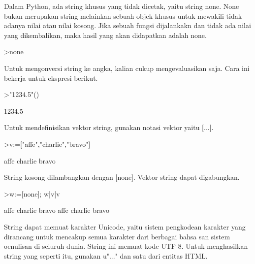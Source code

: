 \documentclass{article}
\begin{document}
\begin{eulernotebook}
\begin{eulercomment}
Dalam Python, ada string khusus yang tidak dicetak, yaitu string none.
None bukan merupakan string melainkan sebuah objek khusus untuk
mewakili tidak adanya nilai atau nilai kosong. Jika sebuah fungsi
dijalankakn dan tidak ada nilai yang dikembalikan, maka hasil yang
akan didapatkan adalah none. 
\end{eulercomment}
\begin{eulerprompt}
>none
\end{eulerprompt}
\begin{eulercomment}
Untuk mengonversi string ke angka, kalian cukup mengevaluasikan saja.
Cara ini bekerja untuk ekspresi berikut.
\end{eulercomment}
\begin{eulerprompt}
>"1234.5"()
\end{eulerprompt}
\begin{euleroutput}
  1234.5
\end{euleroutput}
\begin{eulercomment}
Untuk mendefinisikan vektor string, gunakan notasi vektor yaitu [...].
\end{eulercomment}
\begin{eulerprompt}
>v:=["affe","charlie","bravo"]
\end{eulerprompt}
\begin{euleroutput}
  affe
  charlie
  bravo
\end{euleroutput}
\begin{eulercomment}
String kosong dilambangkan dengan [none]. Vektor string dapat
digabungkan.
\end{eulercomment}
\begin{eulerprompt}
>w:=[none]; w|v|v
\end{eulerprompt}
\begin{euleroutput}
  affe
  charlie
  bravo
  affe
  charlie
  bravo
\end{euleroutput}
\begin{eulercomment}
String dapat memuat karakter Unicode, yaitu sistem pengkodean karakter
yang dirancang untuk mencakup semua karakter dari berbagai bahsa san
sistem oenulisan di seluruh dunia. String ini memuat kode UTF-8. Untuk
menghasilkan string yang seperti itu, gunakan u"..." dan satu dari
entitas HTML.


\end{eulercomment}
\end{eulernotebook}
\end{document}
